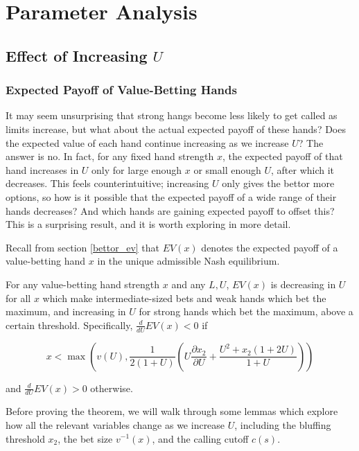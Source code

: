 \documentclass[../../main/main.tex]{subfiles}
\begin{document}
\section{Parameter Analysis}

\subsection{Effect of Increasing $U$}

\subsubsection{Expected Payoff of Value-Betting Hands}

It may seem unsurprising that strong hangs become less likely to get called as limits increase, but what about the actual expected payoff of these hands? Does the expected value of each hand continue increasing as we increase $U$? The answer is no. In fact, for any fixed hand strength $x$, the expected payoff of that hand increases in $U$ only for large enough $x$ or small enough $U$, after which it decreases. This feels counterintuitive; increasing $U$ only gives the bettor more options, so how is it possible that the expected payoff of a wide range of their hands decreases? And which hands are gaining expected payoff to offset this? This is a surprising result, and it is worth exploring in more detail.

Recall from section \ref{bettor_ev} that $EV(x)$ denotes the expected payoff of a value-betting hand $x$ in the unique admissible Nash equilibrium.

\begin{theorem}
    \label{thm:payoff_increasing}
    For any value-betting hand strength $x$ and any $L, U$, $EV(x)$ is decreasing in $U$ for all $x$ which make intermediate-sized bets and weak hands which bet the maximum, and increasing in $U$ for strong hands which bet the maximum, above a certain threshold. Specifically, $\frac{d}{dU} EV(x) < 0$ if 
    
    $$x < \max\left(v(U), \frac{1}{2(1+U)} \left( U \frac{\partial x_2}{\partial U} + \frac{U^2 + x_2(1 + 2U)}{1+U} \right) \right)$$

    and $\frac{d}{dU} EV(x) > 0$ otherwise.
\end{theorem}

Before proving the theorem, we will walk through some lemmas which explore how all the relevant variables change as we increase $U$, including the bluffing threshold $x_2$, the bet size $v^{-1}(x)$, and the calling cutoff $c(s)$.
\end{document}

